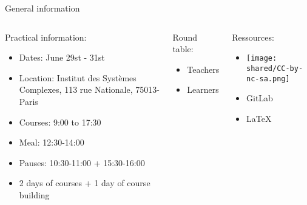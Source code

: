 \documentclass{beamer}
\begin{document}
\begin{frame}{General information}
\begin{columns}
\begin{block}{Practical information:}
\begin{itemize}
    \item Dates: June 29st - 31st
    \item Location: Institut des Systèmes Complexes, 113 rue Nationale, 75013-Paris
    \item Courses: 9:00 to 17:30
    \item Meal: 12:30-14:00
    \item Pauses: 10:30-11:00 + 15:30-16:00
    \item 2 days of courses + 1 day of course building
\end{itemize}
\end{block}
\begin{block}{Round table:}
    \begin{itemize}
        \item Teachers 
        \item Learners
    \end{itemize}
\end{block}
\begin{block}{Ressources:}
    \begin{itemize}
        \item \texttt{[image: shared/CC-by-nc-sa.png]}
        \item GitLab
        \item \LaTeX
    \end{itemize}
\end{block}
\end{columns}
\end{frame}
\end{document}
